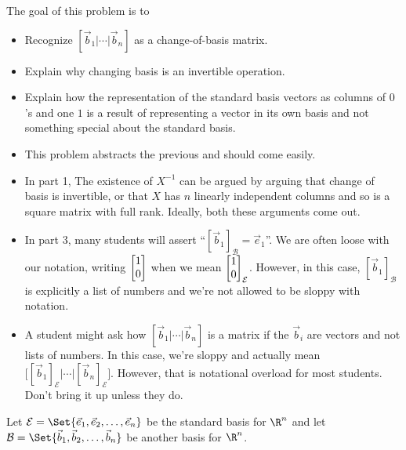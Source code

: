 	\begin{annotation}
		\begin{goals}

			The goal of this problem is to
			\begin{itemize}
				\item Recognize $[\vec b_1|\cdots|\vec b_n]$ as a change-of-basis matrix.
				\item Explain why changing basis is an invertible operation.
				\item Explain how the representation of the standard basis vectors as columns
					of $0$'s and one $1$ is a result of representing a vector in its own
					basis and not something special about the standard basis.
			\end{itemize}
		\end{goals}

		\begin{notes}
			\begin{itemize}
				\item This problem abstracts the previous and should come easily.
				\item In part 1, The existence of $X^{-1}$ can be argued by arguing that change of basis
					is invertible, or that $X$ has $n$ linearly independent columns and
					so is a square matrix with full rank. Ideally, both these arguments come out.
				\item In part 3, many students will assert ``$[\vec b_1]_{\mathcal B}=\vec e_1$''.
					We are often loose with our notation, writing $\mat{1\\0}$
					when we mean $\mat{1\\0}_{\mathcal E}$. However, in this case,
					$[\vec b_1]_{\mathcal B}$ is explicitly a list of numbers and we're
					not allowed to be sloppy with notation.
				\item A student might ask how $[\vec b_1|\cdots|\vec b_n]$ is a matrix if the $\vec b_i$
					are vectors and not lists of numbers. In this case, we're sloppy and actually
					mean $\Big[[\vec b_1]_{\mathcal E}|\cdots|[\vec b_n]_{\mathcal E}\Big]$. However, that is
					notational overload for most students. Don't bring it up unless they do.
			\end{itemize}
		\end{notes}
	\end{annotation}
	Let $\mathcal E=\Set{\vec e_1,\vec e_2,\ldots,\vec e_n}$ be the standard basis for $\R^n$
	and let $\mathcal B=\Set{\vec b_1,\vec b_2,\ldots,\vec b_n}$ be another basis for $\R^n$.
